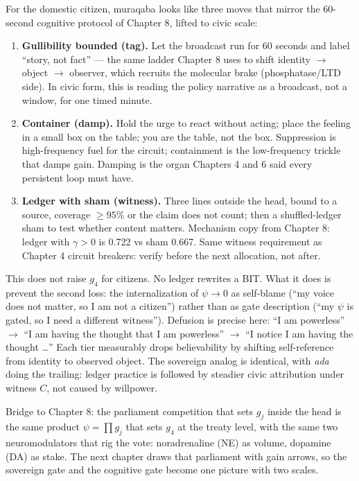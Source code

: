 For the domestic citizen, muraqaba looks like three moves that mirror the 60-second cognitive protocol of Chapter 8, lifted to civic scale:

\begin{enumerate}
\item \textbf{Gullibility bounded (tag).} Let the broadcast run for 60 seconds and label ``story, not fact'' --- the same ladder Chapter 8 uses to shift identity $\to$ object $\to$ observer, which recruits the molecular brake (phosphatase/LTD side). In civic form, this is reading the policy narrative as a broadcast, not a window, for one timed minute.
\item \textbf{Container (damp).} Hold the urge to react without acting; place the feeling in a small box on the table; you are the table, not the box. Suppression is high-frequency fuel for the circuit; containment is the low-frequency trickle that damps gain. Damping is the organ Chapters 4 and 6 said every persistent loop must have.
\item \textbf{Ledger with sham (witness).} Three lines outside the head, bound to a source, coverage $\geq95\%$ or the claim does not count; then a shuffled-ledger sham to test whether content matters. Mechanism copy from Chapter 8: ledger with $\gamma>0$ is 0.722 vs sham 0.667. Same witness requirement as Chapter 4 circuit breakers: verify before the next allocation, not after.
\end{enumerate}

This does not raise $g_4$ for citizens. No ledger rewrites a BIT. What it does is prevent the second loss: the internalization of $\psi\to0$ as self-blame (``my voice does not matter, so I am not a citizen'') rather than as gate description (``my $\psi$ is gated, so I need a different witness''). Defusion is precise here: ``I am powerless'' $\to$ ``I am having the thought that I am powerless'' $\to$ ``I notice I am having the thought \dots'' Each tier measurably drops believability by shifting self-reference from identity to observed object. The sovereign analog is identical, with \textit{ada} doing the trailing: ledger practice is followed by steadier civic attribution under witness $C$, not caused by willpower.

Bridge to Chapter 8: the parliament competition that sets $g_j$ inside the head is the same product $\psi=\prod g_j$ that sets $g_4$ at the treaty level, with the same two neuromodulators that rig the vote: noradrenaline (NE) as volume, dopamine (DA) as stake. The next chapter draws that parliament with gain arrows, so the sovereign gate and the cognitive gate become one picture with two scales.

